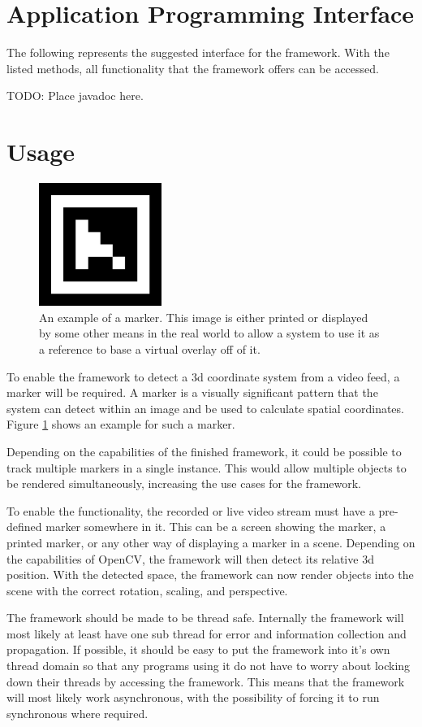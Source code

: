\section{Application Programming Interface}

The following represents the suggested interface for the framework.
With the listed methods, all functionality that the framework offers can be accessed.

TODO: Place javadoc here.

\section{Usage}

\begin{figure}
	\centering
	\includegraphics[width=4cm]{img/marker_example.png}
	\caption[Example Marker.]{An example of a marker. This image is either printed or displayed by some other means in the real world to allow a system to use it as a reference to base a virtual overlay off of it.}
	\label{fig:marker_example}
\end{figure}

To enable the framework to detect a 3d coordinate system from a video feed, a marker will be required.
A marker is a visually significant pattern that the system can detect within an image and be used to calculate spatial coordinates. Figure \ref{fig:marker_example} shows an example for such a marker.

Depending on the capabilities of the finished framework, it could be possible to track multiple markers in a single instance.
This would allow multiple objects to be rendered simultaneously, increasing the use cases for the framework.

To enable the functionality, the recorded or live video stream must have a pre-defined marker somewhere in it.
This can be a screen showing the marker, a printed marker, or any other way of displaying a marker in a scene.
Depending on the capabilities of OpenCV, the framework will then detect its relative 3d position.
With the detected space, the framework can now render objects into the scene with the correct rotation, scaling, and perspective.

The framework should be made to be thread safe.
Internally the framework will most likely at least have one sub thread for error and information collection and propagation.
If possible, it should be easy to put the framework into it's own thread domain so that any programs using it do not have to worry about locking down their threads by accessing the framework.
This means that the framework will most likely work asynchronous, with the possibility of forcing it to run synchronous where required.

